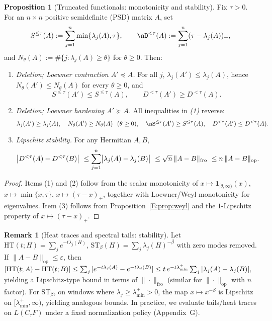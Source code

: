\documentclass[11pt]{article}
\numberwithin{equation}{section}
\theoremstyle{plain}
\theoremstyle{definition}
\theoremstyle{remark}
\theoremstyle{plain}
\theoremstyle{definition}
\numberwithin{equation}{section}
\newtheorem{proposition}[theorem]{Proposition}
\theoremstyle{definition}
\newtheorem{remark}[theorem]{Remark}
\numberwithin{equation}{section}
\theoremstyle{plain}
\theoremstyle{definition}
\theoremstyle{remark}
\providecommand{\n}{\unskip\space}
\begin{document}
\begin{proposition}[Truncated functionals: monotonicity and stability]\label{E:prop:trunc-func}
Fix \(\tau>0\).
For an \(n\times n\) positive semidefinite (PSD) matrix \(A\), set
\[
S^{\le\tau}(A):=\sum_{j=1}^n \min\{\lambda_j(A),\tau\},\n\qquad\nD^{<\tau}(A):=\sum_{j=1}^n (\tau-\lambda_j(A))_{+},
\]
and \(N_\theta(A):=\#\{j:\lambda_j(A)\ge \theta\}\) for \(\theta\ge 0\).
Then:
\begin{enumerate}[leftmargin=1.15em,label=(\arabic*)]
\item \emph{Deletion; Loewner contraction \(A'\preceq A\).}
For all \(j\), \(\lambda_j(A')\le \lambda_j(A)\), hence \(N_\theta(A')\le N_\theta(A)\) for every \(\theta\ge 0\), and
\[
S^{\le\tau}(A')\le S^{\le\tau}(A),\qquad D^{<\tau}(A')\ge D^{<\tau}(A).
\]
\item \emph{Deletion; Loewner hardening \(A'\succeq A\).}
All inequalities in \emph{(1)} reverse:
\[
\lambda_j(A')\ge \lambda_j(A),\quad N_\theta(A')\ge N_\theta(A)\ \ (\theta\ge 0),\quad\nS^{\le\tau}(A')\ge S^{\le\tau}(A),\quad D^{<\tau}(A')\le D^{<\tau}(A).
\]
\item \emph{Lipschitz stability.} For any Hermitian \(A,B\),
\[
\bigl|D^{<\tau}(A)-D^{<\tau}(B)\bigr|\n\ \le \sum_{j=1}^n \bigl|\lambda_j(A)-\lambda_j(B)\bigr|\n\ \le \sqrt{n}\,\|A-B\|_{\mathrm{fro}}\n\ \le n\,\|A-B\|_{\mathrm{op}}.
\]
\end{enumerate}
\end{proposition}

\begin{proof}
Items (1) and (2) follow from the scalar monotonicity of \(x\mapsto \mathbf{1}_{[\theta,\infty)}(x)\), \(x\mapsto \min\{x,\tau\}\), \(x\mapsto (\tau-x)_+\), together with Loewner/Weyl monotonicity for eigenvalues.
Item (3) follows from Proposition~\ref{E:prop:weyl} and the \(1\)-Lipschitz property of \(x\mapsto(\tau-x)_+\).
\end{proof}

\begin{remark}[Heat traces and spectral tails: stability]
Let \(\mathrm{HT}(t;H)=\sum_j e^{-t\lambda_j(H)}\), \(\mathrm{ST}_\beta(H)=\sum_j \lambda_j(H)^{-\beta}\) with zero modes removed.
If \(\|A-B\|_{\mathrm{op}}\le\varepsilon\), then
\(\n|\mathrm{HT}(t;A)-\mathrm{HT}(t;B)|\le \sum_j |e^{-t\lambda_j(A)}-e^{-t\lambda_j(B)}|\n\le t\,e^{-t\lambda_{\min}^+}\sum_j |\lambda_j(A)-\lambda_j(B)|,\n\)
yielding a Lipschitz-type bound in terms of \(\|\cdot\|_{\mathrm{fro}}\) (similar for \(\|\cdot\|_{\mathrm{op}}\) with \(n\) factor).
For \(\mathrm{ST}_\beta\), on windows where \(\lambda_j\ge \lambda_{\min}^+>0\), the map \(x\mapsto x^{-\beta}\) is Lipschitz on \([\lambda_{\min}^+,\infty)\), yielding analogous bounds.
In practice, we evaluate tails/heat traces on \(L(C_\tau F)\) under a fixed normalization policy (Appendix~G).
\end{remark}
\end{document}
